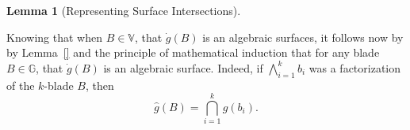 \documentclass{birkjour}
\newtheorem{lem}[thm]{Lemma}
\theoremstyle{definition}
\theoremstyle{remark}
\numberwithin{equation}{section}
\newcommand{\G}{\mathbb{G}}
\newcommand{\V}{\mathbb{V}}
\newcommand{\gd}{\dot{g}}
\newcommand{\gh}{\hat{g}}
\begin{document}
\begin{lem}[Representing Surface Intersections]
\end{lem}

Knowing that when $B\in\V$, that $\gd(B)$ is an algebraic surfaces, it follows now by by Lemma~\ref{}
and the principle of mathematical induction that for any blade $B\in\G$, that $\gd(B)$ is an algebraic
surface.  Indeed, if $\bigwedge_{i=1}^k b_i$ was a factorization of the $k$-blade $B$, then
\begin{equation*}
\gh(B) = \bigcap_{i=1}^k \gh(b_i).
\end{equation*}
\end{document}
